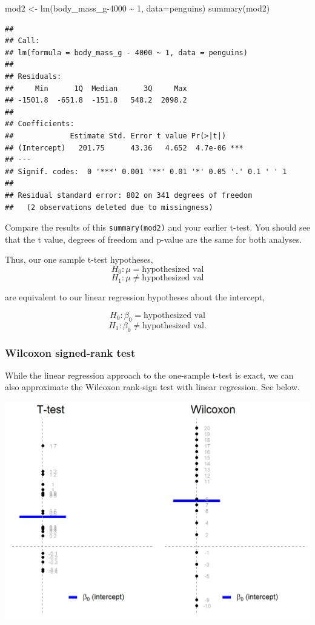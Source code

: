 \documentclass[
  openany]{book}
\newenvironment{Shaded}{\begin{snugshade}}{\end{snugshade}}
\newcommand{\AttributeTok}[1]{\textcolor[rgb]{0.77,0.63,0.00}{#1}}
\newcommand{\DecValTok}[1]{\textcolor[rgb]{0.00,0.00,0.81}{#1}}
\newcommand{\FunctionTok}[1]{\textcolor[rgb]{0.00,0.00,0.00}{#1}}
\newcommand{\NormalTok}[1]{#1}
\newcommand{\OtherTok}[1]{\textcolor[rgb]{0.56,0.35,0.01}{#1}}
\newcommand{\SpecialCharTok}[1]{\textcolor[rgb]{0.00,0.00,0.00}{#1}}
\begin{document}
\begin{Shaded}
\begin{Highlighting}[]
\NormalTok{mod2 }\OtherTok{\textless{}{-}} \FunctionTok{lm}\NormalTok{(body\_mass\_g}\DecValTok{{-}4000} \SpecialCharTok{\textasciitilde{}} \DecValTok{1}\NormalTok{, }\AttributeTok{data=}\NormalTok{penguins)}
\FunctionTok{summary}\NormalTok{(mod2)}
\end{Highlighting}
\end{Shaded}

\begin{verbatim}
## 
## Call:
## lm(formula = body_mass_g - 4000 ~ 1, data = penguins)
## 
## Residuals:
##     Min      1Q  Median      3Q     Max 
## -1501.8  -651.8  -151.8   548.2  2098.2 
## 
## Coefficients:
##             Estimate Std. Error t value Pr(>|t|)    
## (Intercept)   201.75      43.36   4.652  4.7e-06 ***
## ---
## Signif. codes:  0 '***' 0.001 '**' 0.01 '*' 0.05 '.' 0.1 ' ' 1
## 
## Residual standard error: 802 on 341 degrees of freedom
##   (2 observations deleted due to missingness)
\end{verbatim}

Compare the results of this \texttt{summary(mod2)} and your earlier t-test. You should see that the t value, degrees of freedom and p-value are the same for both analyses.

Thus, our one sample t-test hypotheses,
\[H_0: \mu = \text{hypothesized val}\]
\[H_1: \mu \ne \text{hypothesized val}\]

are equivalent to our linear regression hypotheses about the intercept,

\[H_0: \beta_0 = \text{hypothesized val}\]
\[H_1: \beta_0 \ne \text{hypothesized val}.\]

\hypertarget{wilcoxon-signed-rank-test}{%
\subsubsection{Wilcoxon signed-rank test}\label{wilcoxon-signed-rank-test}}

While the linear regression approach to the one-sample t-test is exact, we can also approximate the Wilcoxon rank-sign test with linear regression. See below.

\begin{center}\includegraphics[width=0.9\linewidth]{images/m1/wilcoxon} \end{center}
\end{document}
